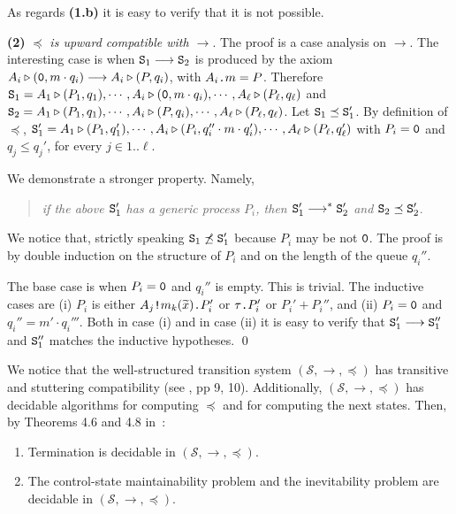 \documentclass{LMCS}
\newcommand{\cal}{\mathcal}
\theoremstyle{plain}\newtheorem{proposition}[thm]{Proposition}
\theoremstyle{plain}\newtheorem{lemma}[thm]{Lemma}
\theoremstyle{plain}\newtheorem{theorem}[thm]{Theorem}
\theoremstyle{plain}\newtheorem{corollary}[thm]{Corollary}
\newcommand{\pinull}{{\tt 0}}
\newcommand{\invk}{\mbox{\tt !}}
\newcommand{\prefix}{\mbox{\tt .}}
\newcommand{\State}{{\tt S}}
\newcommand{\lred}[1]{\stackrel{#1}{\longrightarrow}}
\newcommand{\wt}[1]{\widetilde{#1}}
\newcommand{\xbar}{\wt{x}}
\begin{document}
As regards {\bf (1.b)} it is easy to verify that it is not possible.

\medskip

{\bf (2)} \emph{$\preceq$ is upward compatible with $\lred{}$}. The proof is a case analysis on $\lred{}$.
The interesting case is when $\State_1 \lred{} \State_2$ is produced by the axiom 
$A_i \triangleright (\pinull, m \cdot q_i) \lred{} A_i \triangleright (P, q_i)$,
with $A_i \prefix m = P$. Therefore $\State_1 = A_1 \triangleright (P_1, q_1),
\cdots , A_i \triangleright (\pinull, m \cdot q_i), \cdots , A_\ell  
\triangleright (P_\ell, q_\ell)$ and 
$\State_2 = A_1 \triangleright (P_1, q_1),
\cdots , A_i \triangleright (P, q_i), \cdots , A_\ell  
\triangleright (P_\ell, q_\ell)$.
Let $\State_1 \preceq \State_1'$. 
By definition of $\preceq$,
$\State_1' = A_1 \triangleright (P_1, q_1'),
\cdots , A_i \triangleright (P_i, q_i'' \cdot m \cdot q_i'), \cdots , A_\ell  
\triangleright (P_\ell, q_\ell')$ with $P_i = \pinull$ and $q_j \leq q_j'$, for every $j \in 1..\ell$.

We demonstrate a stronger property. Namely, 
\begin{quote}
\emph{if the above $\State_1'$ has a generic process $P_i$, then $\State_1' 
\lred{}^* \State_2'$ and $\State_2 \preceq \State_2'$}. 
\end{quote}
We notice that,
strictly speaking $\State_1 \not \preceq \State_1'$ because $P_i$ may be 
not $\pinull$. The
proof is by double induction on the 
structure of $P_i$ and on the length of the queue $q_i''$.

The base case is when $P_i = \pinull$ and $q_i''$ is empty. This is trivial. 
The inductive cases are (i) $P_i$ is either
$A_j \invk m_k(\xbar) \prefix P_i'$ or $\tau \prefix P_i'$ or
$P_i'+P_i''$, and (ii) $P_i = \pinull$ and $q_i'' = m'\cdot q_i'''$.
Both in case (i) and in case (ii) it is easy to verify that $\State_1' \lred{}
\State_1''$ and $\State_1''$ matches the inductive hypotheses.
\qed
\fi

\bigskip

We notice that the well-structured transition system $({\cal S}, \lred{}, \preceq)$ has transitive and stuttering compatibility (see \cite{Finkel:2001}, pp 9, 10). Additionally, $({\cal S}, \lred{}, \preceq)$ has decidable algorithms for 
computing $\preceq$ and for computing the next states. Then, by Theorems 4.6
and 4.8 in~\cite{Finkel:2001}:

\begin{thm}
\begin{enumerate}
\item
Termination is decidable in $({\cal S}, \lred{}, \preceq)$.
\item
The control-state maintainability problem and the inevitability problem are decidable in $({\cal S}, \lred{}, \preceq)$.
\end{enumerate}
\end{thm}
\fi
\end{document}
